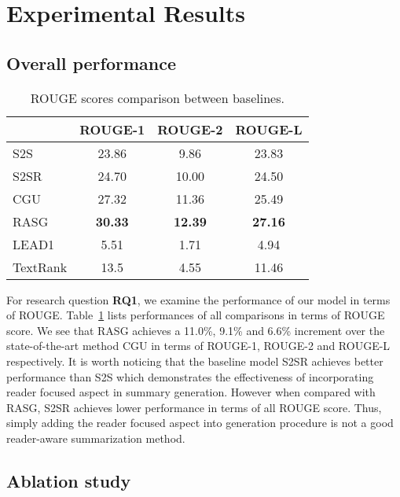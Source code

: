 \documentclass[letterpaper]{article} \usepackage{aaai19}  \usepackage{times}  \usepackage{helvet}  \usepackage{courier}
\newcommand{\dubbelop}{$^{\blacktriangle}$}
\begin{document}
\section{Experimental Results}

\subsection{Overall performance}

\newcommand{\cbkgrnd}{\cellcolor{blue!15}}
\newcommand{\phantomtriangle}{\phantom{\dubbelop}}
\begin{table}[t]
\centering
\small
\caption{ROUGE scores comparison between baselines.}
\begin{tabular}{@{}l ccc @{}}
\toprule
& ROUGE-1 & ROUGE-2 & ROUGE-L \\
\midrule
S2S &  23.86 & 9.86 & 23.83 \\
S2SR &  24.70 & 10.00 & 24.50 \\
CGU & 27.32 & 11.36 & 25.49  \\
RASG & \textbf{30.33} & \textbf{12.39} & \textbf{27.16} \\
\midrule
LEAD1 & 5.51 & 1.71 & 4.94 \\
TextRank & 13.5 & 4.55 & 11.46 \\
\bottomrule
\end{tabular}
\label{tab:comp_rouge_baselines}
\end{table}

For research question \textbf{RQ1}, we examine the performance of our model in terms of ROUGE. 
Table~\ref{tab:comp_rouge_baselines} lists performances of all comparisons in terms of ROUGE score.
We see that RASG achieves a 11.0\%, 9.1\% and 6.6\% increment over the state-of-the-art method CGU in terms of ROUGE-1, ROUGE-2 and ROUGE-L respectively.
It is worth noticing that the baseline model S2SR achieves better performance than S2S which demonstrates the effectiveness of incorporating reader focused aspect in summary generation.
However when compared with RASG, S2SR achieves lower performance in terms of all ROUGE score.
Thus, simply adding the reader focused aspect into generation procedure is not a good reader-aware summarization method.

\subsection{Ablation study}
\end{document}
